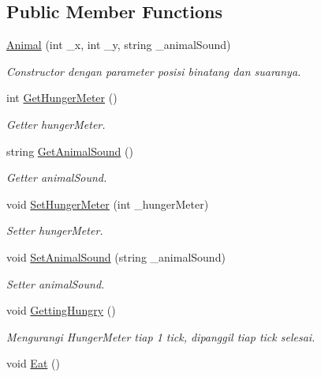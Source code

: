\subsection*{Public Member Functions}
\begin{DoxyCompactItemize}
\item 
\mbox{\hyperlink{classAnimal_a0895c473f5d1a074447a1a0a9f1def61}{Animal}} (int \+\_\+x, int \+\_\+y, string \+\_\+animal\+Sound)
\begin{DoxyCompactList}\small\item\em Constructor dengan parameter posisi binatang dan suaranya. \end{DoxyCompactList}\item 
int \mbox{\hyperlink{classAnimal_af615c696ba45912dffeb7a149f531238}{Get\+Hunger\+Meter}} ()
\begin{DoxyCompactList}\small\item\em Getter hunger\+Meter. \end{DoxyCompactList}\item 
string \mbox{\hyperlink{classAnimal_a3656294d99761e2e7786eb592cecfd15}{Get\+Animal\+Sound}} ()
\begin{DoxyCompactList}\small\item\em Getter animal\+Sound. \end{DoxyCompactList}\item 
void \mbox{\hyperlink{classAnimal_a4d6894b8b33ce7cf3d6dc42c64f06b76}{Set\+Hunger\+Meter}} (int \+\_\+hunger\+Meter)
\begin{DoxyCompactList}\small\item\em Setter hunger\+Meter. \end{DoxyCompactList}\item 
void \mbox{\hyperlink{classAnimal_af8fdb2bbb3d2ae4d1f70b850a71e42ab}{Set\+Animal\+Sound}} (string \+\_\+animal\+Sound)
\begin{DoxyCompactList}\small\item\em Setter animal\+Sound. \end{DoxyCompactList}\item 
void \mbox{\hyperlink{classAnimal_a24334feff002c33f5513902546daba9b}{Getting\+Hungry}} ()
\begin{DoxyCompactList}\small\item\em Mengurangi Hunger\+Meter tiap 1 tick, dipanggil tiap tick selesai. \end{DoxyCompactList}\item 
void \mbox{\hyperlink{classAnimal_acdae3d782b7451096932296179860a12}{Eat}} ()

\end{DoxyCompactItemize}
